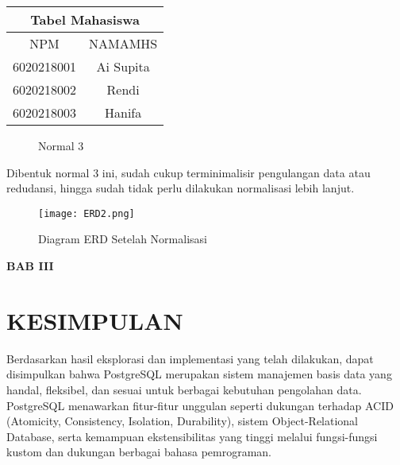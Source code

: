 \documentclass[12pt,a4paper]{article}
\begin{document}
\begin{multicols}{3}
  \begin{adjustbox}{scale=0.6,center}
    \begin{tabular}{ |c|c| } 
      \hline \multicolumn{2}{|c|}{Tabel Mahasiswa} \\ \hline
      NPM        & NAMAMHS   \\ \hline \hline
      6020218001 & Ai Supita \\ \hline
      6020218002 & Rendi     \\ \hline
      6020218003 & Hanifa    \\ \hline
    \end{tabular}
  \end{adjustbox}


\end{multicols}

\begin{figure}[h]
  \centering
  \caption{\small{Normal 3}}
\end{figure}

Dibentuk normal 3 ini, sudah cukup terminimalisir pengulangan data atau
redudansi, hingga sudah tidak perlu dilakukan normalisasi lebih lanjut.

\begin{figure}[h]
  \centering
  \texttt{[image: ERD2.png]}
  \caption{\small{Diagram ERD Setelah Normalisasi}}
\end{figure}

\newpage 

\begin{center}

  \large{\textbf{BAB III}}

  \section*{KESIMPULAN}

\end{center}


Berdasarkan hasil eksplorasi dan implementasi yang telah dilakukan, dapat
disimpulkan bahwa PostgreSQL merupakan sistem manajemen basis data yang
handal, fleksibel, dan sesuai untuk berbagai kebutuhan pengolahan data.
PostgreSQL menawarkan fitur-fitur unggulan seperti dukungan terhadap ACID
(Atomicity, Consistency, Isolation, Durability), sistem Object-Relational 
Database, serta kemampuan ekstensibilitas yang tinggi melalui fungsi-fungsi
kustom dan dukungan berbagai bahasa pemrograman.
\end{document}
